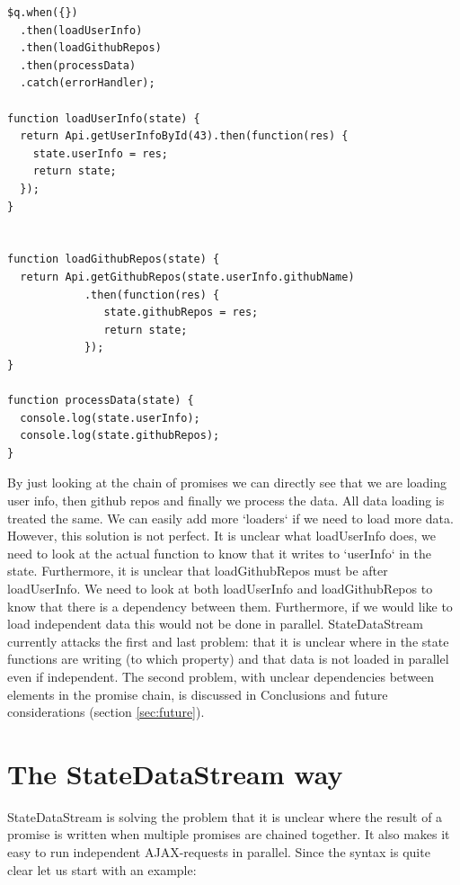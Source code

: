 \documentclass[a4paper,12pt]{article}
\begin{document}
\begin{lstlisting}[caption={Code where we are using promises and have separated data loading from data processing as well as made it very clear what data we are loading}, frame=single]
$q.when({})
  .then(loadUserInfo)
  .then(loadGithubRepos)
  .then(processData)
  .catch(errorHandler);

function loadUserInfo(state) {
  return Api.getUserInfoById(43).then(function(res) {
    state.userInfo = res;
    return state;
  });
}


function loadGithubRepos(state) {
  return Api.getGithubRepos(state.userInfo.githubName)
            .then(function(res) {
               state.githubRepos = res;
               return state;
            });
}

function processData(state) {
  console.log(state.userInfo);
  console.log(state.githubRepos);
}
\end{lstlisting}
By just looking at the chain of promises we can directly see that we are loading user info, then github repos and finally we process the data.
All data loading is treated the same. We can easily add more `loaders` if we need to load more data. However, this solution is not perfect.
It is unclear what loadUserInfo does, we need to look at the actual function to know that it writes to `userInfo` in the state. Furthermore,
it is unclear that loadGithubRepos must be after loadUserInfo. We need to look at both loadUserInfo and loadGithubRepos to know that there
is a dependency between them. Furthermore, if we would like to load independent data this would not be done in parallel. 
StateDataStream currently attacks the first and last problem: that it is unclear where in the state functions are writing (to which property) and that data is not loaded in parallel even if independent.
The second problem, with unclear dependencies between elements in the promise chain, is discussed in Conclusions and future considerations (section \ref{sec:future}).
\clearpage
\section{The StateDataStream way}
StateDataStream is solving the problem that it is unclear where the result of a promise is written when multiple promises are chained together. 
It also makes it easy to run independent AJAX-requests in parallel. Since the syntax is quite clear let us start with an example:
\end{document}
